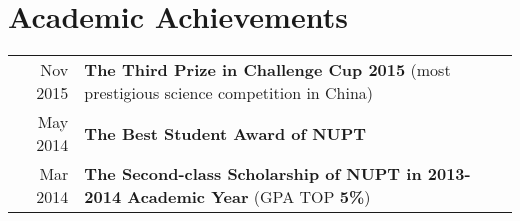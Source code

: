 \documentclass[a4paper, 11pt]{extarticle} %
\begin{document}
\vspace{-0.5cm}
\section{Academic Achievements}

\begin{tabular}{rl}
Nov 2015 & \hspace{10mm}\textbf{The Third Prize in Challenge Cup 2015 }(most prestigious  science competition in China)\\

May 2014 & \hspace{10mm}\textbf{The Best Student Award of NUPT}\\

Mar 2014 & \hspace{10mm}\textbf{The Second-class Scholarship of NUPT in 2013-2014 Academic Year } (GPA TOP \textbf{5\%})\\
\end{tabular}




%
\end{document}
